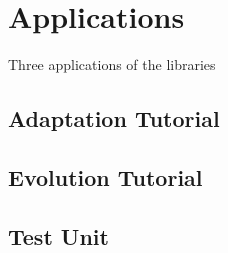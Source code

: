 \chapter{Applications}
\label{sec:application}

Three applications of the libraries

\section{Adaptation Tutorial}
\label{sec:conclusion:sec1}

\section{Evolution Tutorial}
\label{sec:conclusion:sec1}

\section{Test Unit}
\label{sec:conclusion:sec1}

